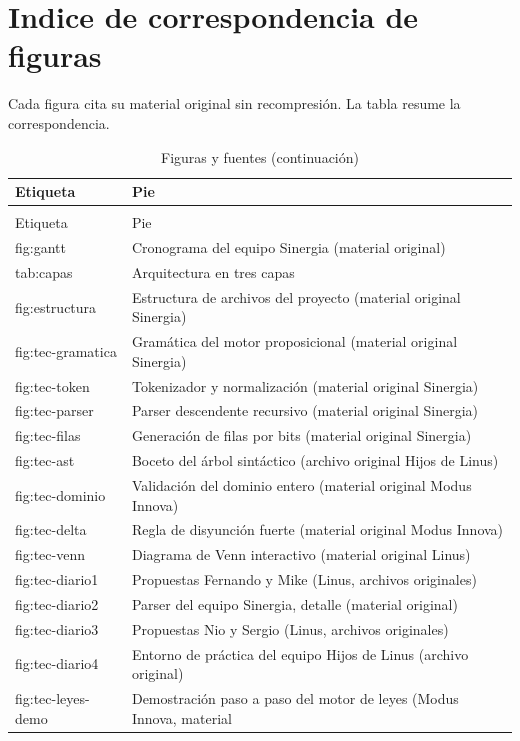 \documentclass[11pt,a4paper,openany]{book}
\begin{document}
\chapter{Indice de correspondencia de figuras}
\label{ch:fig-index}
Cada figura cita su material original sin recompresi\'on. La tabla resume la correspondencia.
\begin{center}
\small
\begin{longtable}{ll}
\caption{Figuras y fuentes} \\
\toprule
Etiqueta & Pie \\
\midrule
\endfirsthead
\caption{Figuras y fuentes (continuaci\'on)} \\
\toprule
Etiqueta & Pie \\
\midrule
\endhead
fig:gantt & Cronograma del equipo Sinergia (material original) \\
tab:capas & Arquitectura en tres capas \\
fig:estructura & Estructura de archivos del proyecto (material original Sinergia) \\
fig:tec-gramatica & Gram\'atica del motor proposicional (material original Sinergia) \\
fig:tec-token & Tokenizador y normalizaci\'on (material original Sinergia) \\
fig:tec-parser & Parser descendente recursivo (material original Sinergia) \\
fig:tec-filas & Generaci\'on de filas por bits (material original Sinergia) \\
fig:tec-ast & Boceto del \'arbol sint\'actico (archivo original Hijos de Linus) \\
fig:tec-dominio & Validaci\'on del dominio entero (material original Modus Innova) \\
fig:tec-delta & Regla de disyunci\'on fuerte (material original Modus Innova) \\
fig:tec-venn & Diagrama de Venn interactivo (material original Linus) \\
fig:tec-diario1 & Propuestas Fernando y Mike (Linus, archivos originales) \\
fig:tec-diario2 & Parser del equipo Sinergia, detalle (material original) \\
fig:tec-diario3 & Propuestas Nio y Sergio (Linus, archivos originales) \\
fig:tec-diario4 & Entorno de pr\'actica del equipo Hijos de Linus (archivo original) \\
fig:tec-leyes-demo & Demostraci\'on paso a paso del motor de leyes (Modus Innova, material  \\

\end{longtable}
\end{center}
\end{document}
